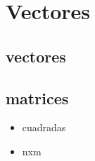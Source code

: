 
\section{Vectores}

\subsection{vectores}

\subsection{matrices}
\begin{itemize}
    \item cuadradas
    \item nxm
\end{itemize}
